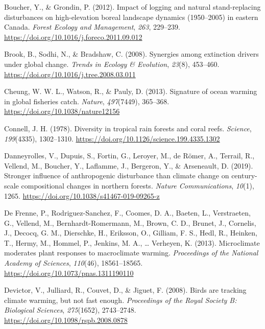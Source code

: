 \documentclass[
  a4paperpaper,
]{article}
\begin{document}
\leavevmode\hypertarget{ref-boucher_impact_2012}{}%
Boucher, Y., \& Grondin, P. (2012). Impact of logging and natural
stand-replacing disturbances on high-elevation boreal landscape dynamics
(1950--2005) in eastern Canada. \emph{Forest Ecology and Management},
\emph{263}, 229--239. \url{https://doi.org/10.1016/j.foreco.2011.09.012}

\leavevmode\hypertarget{ref-brook_synergies_2008}{}%
Brook, B., Sodhi, N., \& Bradshaw, C. (2008). Synergies among extinction
drivers under global change. \emph{Trends in Ecology \& Evolution},
\emph{23}(8), 453--460. \url{https://doi.org/10.1016/j.tree.2008.03.011}

\leavevmode\hypertarget{ref-cheung_signature_2013}{}%
Cheung, W. W. L., Watson, R., \& Pauly, D. (2013). Signature of ocean
warming in global fisheries catch. \emph{Nature}, \emph{497}(7449),
365--368. \url{https://doi.org/10.1038/nature12156}

\leavevmode\hypertarget{ref-connell_diversity_1978}{}%
Connell, J. H. (1978). Diversity in tropical rain forests and coral
reefs. \emph{Science}, \emph{199}(4335), 1302--1310.
\url{https://doi.org/10.1126/science.199.4335.1302}

\leavevmode\hypertarget{ref-danneyrolles_stronger_2019}{}%
Danneyrolles, V., Dupuis, S., Fortin, G., Leroyer, M., de Römer, A.,
Terrail, R., Vellend, M., Boucher, Y., Laflamme, J., Bergeron, Y., \&
Arseneault, D. (2019). Stronger influence of anthropogenic disturbance
than climate change on century-scale compositional changes in northern
forests. \emph{Nature Communications}, \emph{10}(1), 1265.
\url{https://doi.org/10.1038/s41467-019-09265-z}

\leavevmode\hypertarget{ref-de_frenne_microclimate_2013}{}%
De Frenne, P., Rodriguez-Sanchez, F., Coomes, D. A., Baeten, L.,
Verstraeten, G., Vellend, M., Bernhardt-Romermann, M., Brown, C. D.,
Brunet, J., Cornelis, J., Decocq, G. M., Dierschke, H., Eriksson, O.,
Gilliam, F. S., Hedl, R., Heinken, T., Hermy, M., Hommel, P., Jenkins,
M. A., \ldots{} Verheyen, K. (2013). Microclimate moderates plant
responses to macroclimate warming. \emph{Proceedings of the National
Academy of Sciences}, \emph{110}(46), 18561--18565.
\url{https://doi.org/10.1073/pnas.1311190110}

\leavevmode\hypertarget{ref-devictor_birds_2008}{}%
Devictor, V., Julliard, R., Couvet, D., \& Jiguet, F. (2008). Birds are
tracking climate warming, but not fast enough. \emph{Proceedings of the
Royal Society B: Biological Sciences}, \emph{275}(1652), 2743--2748.
\url{https://doi.org/10.1098/rspb.2008.0878}
\end{document}
